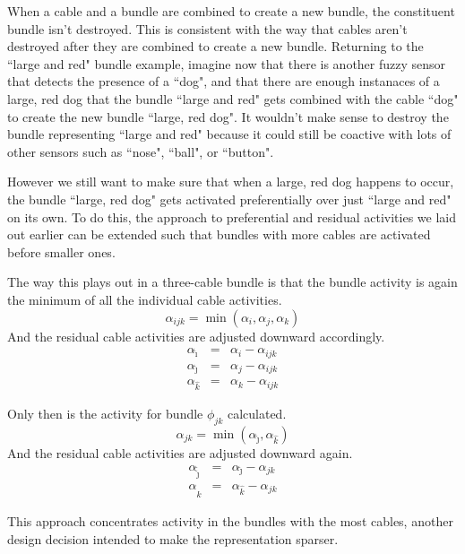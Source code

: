 When a cable and a bundle are combined to create a new bundle, the constituent
bundle isn't destroyed. This is consistent with the way that cables
aren't destroyed after they are combined to create a new bundle.
Returning to the ``large and red" bundle example, imagine now that there
is another fuzzy sensor that detects the presence of a ``dog", and that
there are enough instanaces of a large, red dog that the bundle
``large and red" gets combined with the cable ``dog" to create the new
bundle ``large, red dog". It wouldn't make sense to destroy the bundle
representing ``large and red" because it could still be coactive with lots
of other sensors such as ``nose", ``ball", or ``button".

However we still want to make sure that when a large, red dog happens 
to occur, the bundle ``large, red dog" gets activated preferentially
over just ``large and red" on its own. To do this, the approach to
preferential and residual activities we laid out earlier can be extended
such that bundles with more cables are activated before smaller ones.

The way this plays out in a three-cable bundle is that the bundle activity
is again the minimum of all the individual cable activities.
\begin{equation}
\alpha_{ijk} = \min(\alpha_i, \alpha_j, \alpha_k)
\end{equation}
And the residual cable activities are adjusted downward accordingly.
\begin{eqnarray}
\alpha_{\hat{\imath}} &=& \alpha_i - \alpha_{ijk}\\
\alpha_{\hat{\jmath}} &=& \alpha_j - \alpha_{ijk}\\
\alpha_{\hat{k}} &=& \alpha_k - \alpha_{ijk}
\end{eqnarray}

Only then is the activity for bundle $\phi_{jk}$ calculated.
\begin{equation}
\alpha_{jk} = \min(\alpha_{\hat{\jmath}}, \alpha_{\hat{k}})
\end{equation}
And the residual cable activities are adjusted downward again.
\begin{eqnarray}
\alpha_{\hat{\hat{\jmath}}} &=& \alpha_{\hat{\jmath}} - \alpha_{jk}\\
\alpha_{\hat{\hat{k}}} &=& \alpha_{\hat{k}} - \alpha_{jk}
\end{eqnarray}

This approach concentrates activity in the bundles with the most cables,
another design decision intended to make the representation sparser.

